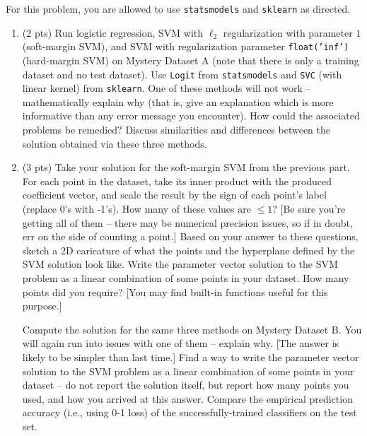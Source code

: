 \documentclass{tron}
\newcommand{\mref}[1]{\underline{\textbf{\hypersetup{linkcolor=orange}\Cref{#1}\hypersetup{linkcolor=blue}}}}
\begin{document}
\newpage
\setcounter{section}{3}
\begin{exercise}{}
For this problem, you are allowed to use \texttt{statsmodels} and \texttt{sklearn} as directed.
\begin{enumerate}
\item (2 pts) Run logistic regression, SVM with $\ell_2$ regularization with parameter $1$ (soft-margin SVM), and SVM with regularization parameter \texttt{float('inf')} (hard-margin SVM) on Mystery Dataset A (note that there is only a training dataset and no test dataset). Use \texttt{Logit} from \texttt{statsmodels} and \texttt{SVC} (with linear kernel) from \texttt{sklearn}.
One of these methods will not work -- mathematically explain why (that is, give an explanation which is more informative than any error message you encounter).
How could the associated problems be remedied?
Discuss similarities and differences between the solution obtained via these three methods. 

\ans{\mref{ans:3:1}} 

\item (3 pts) Take your solution for the soft-margin SVM from the previous part.
For each point in the dataset, take its inner product with the produced coefficient vector, and scale the result by the sign of each point's label (replace 0's with -1's). How many of these values are $\leq 1$? [Be sure you're getting all of them -- there may be numerical precision issues, so if in doubt, err on the side of counting a point.]
Based on your answer to these questions, sketch a 2D caricature of what the points and the hyperplane defined by the SVM solution look like.
Write the parameter vector solution to the SVM problem as a linear combination of some points in your dataset.
How many points did you require?
[You may find built-in functions useful for this purpose.]

Compute the solution for the same three methods on Mystery Dataset B. 
You will again run into issues with one of them -- explain why. [The answer is likely to be simpler than last time.]
Find a way to write the parameter vector solution to the SVM problem as a linear combination of some points in your dataset -- do not report the solution itself, but report how many points you used, and how you arrived at this answer.
Compare the empirical prediction accuracy (i.e., using 0-1 loss) of the successfully-trained classifiers on the test set. 

\ans{\mref{ans:3:2}} 

\end{enumerate}
\end{exercise}
\end{document}
